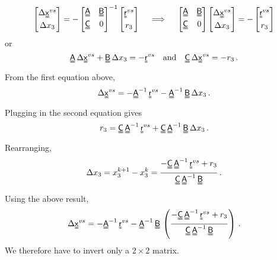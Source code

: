 \[
  \begin{bmatrix} \Delta\Mx^{vs} \\ \Delta x_3 \end{bmatrix} 
   = - \begin{bmatrix} \MAmat & \MBmat \\ \MCmat & 0 \end{bmatrix}^{-1} 
                    \begin{bmatrix} \Mr^{vs} \\ r_3 \end{bmatrix} 
  \quad \implies \quad 
   \begin{bmatrix} \MAmat & \MBmat \\ \MCmat & 0 \end{bmatrix} 
  \begin{bmatrix} \Delta\Mx^{vs} \\ \Delta x_3 \end{bmatrix}  = 
                    -\begin{bmatrix} \Mr^{vs} \\ r_3 \end{bmatrix} 
\]
or
\[
   \MAmat\,\Delta\Mx^{vs} + \MBmat\,\Delta x_3 = -\Mr^{vs} \quad \Tand \quad
   \MCmat\,\Delta\Mx^{vs} = -r_3 \,.
\]
From the first equation above,
\[
  \Delta\Mx^{vs} = -\MAmat^{-1}\,\Mr^{vs} - \MAmat^{-1}\,\MBmat\,\Delta x_3 \,.
\]
Plugging in the second equation gives
\[
   r_3 = \MCmat\,\MAmat^{-1}\,\Mr^{vs} + \MCmat\,\MAmat^{-1}\,\MBmat\,\Delta x_3 \,.
\]
Rearranging,
\[
  \Delta x_3 = x_3^{k+1} - x_3^k = \frac{-\MCmat\,\MAmat^{-1}\,\Mr^{vs} + r_3}{\MCmat\,\MAmat^{-1}\,\MBmat} \,.
\]
Using the above result,
\[
  \Delta\Mx^{vs} = -\MAmat^{-1}\,\Mr^{vs} - \MAmat^{-1}\,\MBmat\,\left(\frac{-\MCmat\,\MAmat^{-1}\,\Mr^{vs} + r_3}{\MCmat\,\MAmat^{-1}\,\MBmat}\right) \,.
\]
We therefore have to invert only a $2 \times 2 $ matrix.

